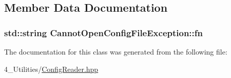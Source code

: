 \subsection{Member Data Documentation}
\subsubsection[{\texorpdfstring{fn}{fn}}]{\setlength{\rightskip}{0pt plus 5cm}std\+::string Cannot\+Open\+Config\+File\+Exception\+::fn\hspace{0.3cm}{\ttfamily [protected]}}\hypertarget{class_cannot_open_config_file_exception_afa011be333c848ca42ad2aa4449cddce}{}\label{class_cannot_open_config_file_exception_afa011be333c848ca42ad2aa4449cddce}


The documentation for this class was generated from the following file\+:\begin{DoxyCompactItemize}
\item 
4\+\_\+\+Utilities/\hyperlink{_config_reader_8hpp}{Config\+Reader.\+hpp}\end{DoxyCompactItemize}
